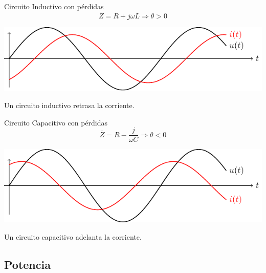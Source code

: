 \documentclass[xcolor={usenames,svgnames,dvipsnames}]{beamer}
\begin{document}
\begin{frame}[label={sec:org21ad8c7}]{Circuito Inductivo con pérdidas}
\[
\overline{Z} = R + j\omega L \Rightarrow \theta > 0
\]

\begin{center}
\includegraphics[width=.9\linewidth]{../figs/inductivo.pdf}
\end{center}

Un circuito inductivo \alert{retrasa la corriente}.
\end{frame}

\begin{frame}[label={sec:orgdbe384b}]{Circuito Capacitivo con pérdidas}
\[
\overline{Z} = R - \frac{j}{\omega C} \Rightarrow \theta < 0
\]

\begin{center}
\includegraphics[width=.9\linewidth]{../figs/capacitivo.pdf}
\end{center}

Un circuito capacitivo \alert{adelanta la corriente}.
\end{frame}

\subsection{Potencia}
\label{sec:org58f09e6}
\end{document}
